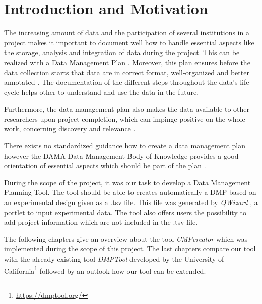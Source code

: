 
\section{Introduction and Motivation}
The increasing amount of data and the participation of several institutions in a project makes it important to document well how to handle essential aspects like the storage, analysis and integration of data during the project. This can be realized with a Data Management Plan \cite{lecture}. Moreover, this plan ensures before the data collection starts that data are in correct format, well-organized and better annotated \cite{planWhy}. The documentation of the different steps throughout the data's life cycle helps other to understand and use the data in the future. 

Furthermore, the data management plan also makes the data available to other researchers upon project completion, which can impinge positive on the whole work, concerning discovery and relevance \cite{planWhy}.


There exists no standardized guidance how to create a data management plan however the DAMA Data Management Body of Knowledge \cite{DAMAInternational:2009:DGD:1593444} provides a good orientation of essential aspects which should be part of the plan \cite{lecture}. 


During the scope of the project, it was our task to develop a Data Management Planning Tool. The tool should be able to creates automatically a DMP based on an experimental design given as a .tsv file. This file was generated by \textit{QWizard} \cite{qwizard}, a portlet to input experimental data. The tool also offers users the possibility to add project information which are not included in the .tsv file.


The following chapters give an overview about the tool \textit{CMPcreator} which was implemented during the scope of this project. The last chapters compare our tool with the  already existing tool \textit{DMPTool} developed by the University of California\footnote{\url{https://dmptool.org/}} followed by an outlook how our tool can be extended.

